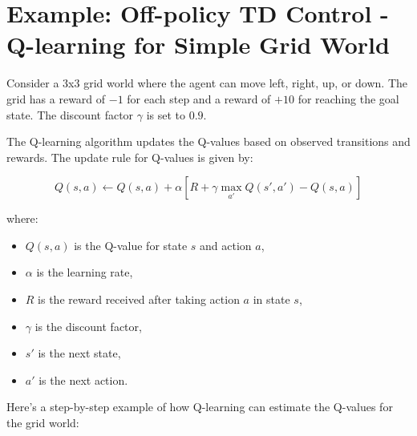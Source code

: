 \documentclass{article}
\begin{document}
\section*{Example: Off-policy TD Control - Q-learning for Simple Grid World}

Consider a 3x3 grid world where the agent can move left, right, up, or down. The grid has a reward of $-1$ for each step and a reward of $+10$ for reaching the goal state. The discount factor $\gamma$ is set to $0.9$.

The Q-learning algorithm updates the Q-values based on observed transitions and rewards. The update rule for Q-values is given by:

\[
Q(s, a) \leftarrow Q(s, a) + \alpha \left[ R + \gamma \max_{a'} Q(s', a') - Q(s, a) \right]
\]

where:
\begin{itemize}
    \item $Q(s, a)$ is the Q-value for state $s$ and action $a$,
    \item $\alpha$ is the learning rate,
    \item $R$ is the reward received after taking action $a$ in state $s$,
    \item $\gamma$ is the discount factor,
    \item $s'$ is the next state,
    \item $a'$ is the next action.
\end{itemize}

Here's a step-by-step example of how Q-learning can estimate the Q-values for the grid world:
\end{document}
